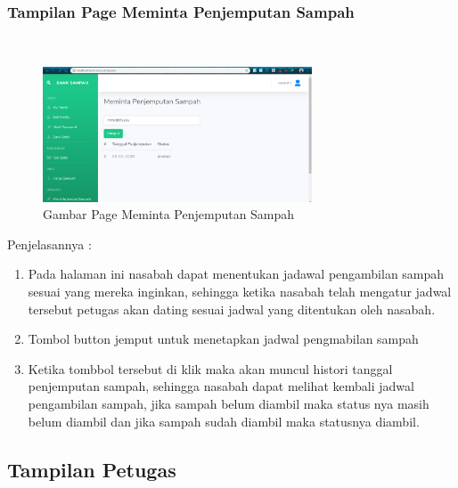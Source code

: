 \subsubsection{Tampilan Page Meminta Penjemputan Sampah}
\hfill\\
	\begin{figure}[H]
		\includegraphics[width=8cm]{figures/analisis/29.png}
		\centering
		\caption{Gambar Page Meminta Penjemputan Sampah}
	\end{figure}
Penjelasannya :
\begin{enumerate}
\item Pada halaman ini nasabah dapat menentukan jadawal pengambilan sampah sesuai yang mereka inginkan, sehingga ketika nasabah telah mengatur jadwal tersebut petugas akan dating sesuai jadwal yang ditentukan oleh nasabah.
\item Tombol button jemput untuk menetapkan jadwal pengmabilan sampah
\item Ketika tombbol tersebut di klik maka akan muncul histori tanggal penjemputan sampah, sehingga nasabah dapat melihat kembali jadwal pengambilan sampah, jika sampah belum diambil maka status nya masih belum diambil dan jika sampah sudah diambil maka statusnya diambil. 
\end{enumerate}


\subsection{Tampilan Petugas}
